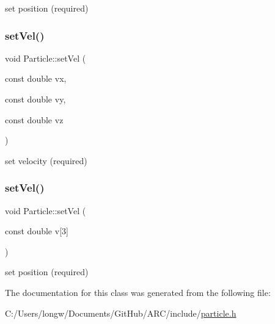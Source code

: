 set position (required) 

\hypertarget{classParticle_a07c405254ac3f03854e7523ff473c828}{}\label{classParticle_a07c405254ac3f03854e7523ff473c828} 
\subsubsection{\texorpdfstring{set\+Vel()}{setVel()}\hspace{0.1cm}{\footnotesize\ttfamily [1/2]}}
{\footnotesize\ttfamily void Particle\+::set\+Vel (\begin{DoxyParamCaption}\item[{const double}]{vx,  }\item[{const double}]{vy,  }\item[{const double}]{vz }\end{DoxyParamCaption})\hspace{0.3cm}{\ttfamily [inline]}}



set velocity (required) 

\hypertarget{classParticle_a433720a7673f9645e4e203c32435e301}{}\label{classParticle_a433720a7673f9645e4e203c32435e301} 
\subsubsection{\texorpdfstring{set\+Vel()}{setVel()}\hspace{0.1cm}{\footnotesize\ttfamily [2/2]}}
{\footnotesize\ttfamily void Particle\+::set\+Vel (\begin{DoxyParamCaption}\item[{const double}]{v\mbox{[}3\mbox{]} }\end{DoxyParamCaption})\hspace{0.3cm}{\ttfamily [inline]}}



set position (required) 



The documentation for this class was generated from the following file\+:\begin{DoxyCompactItemize}
\item 
C\+:/\+Users/longw/\+Documents/\+Git\+Hub/\+A\+R\+C/include/\hyperlink{particle_8h}{particle.\+h}\end{DoxyCompactItemize}
